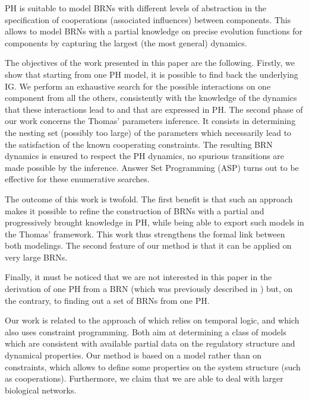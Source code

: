 PH is suitable to model BRNs with different levels of abstraction in the specification of
cooperations (associated influences) between components.
This allows to model BRNs with a partial knowledge on precise evolution functions for components
by capturing the largest (the most general) dynamics.

The objectives of the work presented in this paper are the following.
Firstly, we show that starting from one PH model, it is possible to find back the underlying IG.
We perform an exhaustive search for the possible interactions on one component from all the
others, consistently with the knowledge of the dynamics that these interactions lead to and that are
expressed in PH.
The second phase of our work concerns the Thomas' parameters inference.
It consists in determining the nesting set (possibly too large) of the parameters which necessarily
lead to the satisfaction of the known cooperating constraints.
The resulting BRN dynamics is ensured to respect the PH dynamics, \ie no spurious transitions are
made possible by the inference.
Answer Set Programming (ASP) \cite{Baral03} turns out to be effective for these enumerative searches.

The outcome of this work is twofold.
The first benefit is that such an approach makes it possible to refine the construction of
BRNs with a partial and progressively brought knowledge in PH, while being able to export such
models in the Thomas' framework.
This work thus strengthens the formal link between both modelings.
The second feature of our method is that it can be applied on very large BRNs.

Finally, it must be noticed that we are not interested in this paper in the derivation of one
PH from a BRN (which was previously described in \cite{PMR10-TCSB}) but, on the contrary, to finding out
a set of BRNs from one PH.

Our work is related to the approach of \cite{Khalis09} which relies on temporal logic, and \cite{20646302,DBLP:conf/ipcat/CorblinFTCT12} which also uses constraint programming. Both aim at determining a class of models which are consistent with available partial data on the regulatory structure and dynamical properties.
Our method is based on a model rather than on constraints, which allows to define some properties on the system structure (such as cooperations).
Furthermore, we claim that we are able to deal with larger biological networks.

